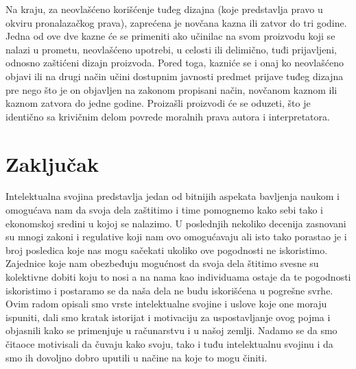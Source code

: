 \documentclass[a4paper]{article}
\begin{document}
Na kraju, za neovlašćeno korišćenje tuđeg dizajna (koje predstavlja pravo u okviru pronalazačkog prava), zaprećena je novčana kazna ili zatvor do tri godine. Jedna od ove dve kazne će se primeniti ako učinilac na svom proizvodu koji se nalazi u prometu, neovlašćeno upotrebi, u celosti ili delimično, tuđi prijavljeni, odnosno zaštićeni dizajn proizvoda. Pored toga, kazniće se i onaj ko neovlašćeno objavi ili na drugi način učini dostupnim javnosti predmet prijave tuđeg dizajna pre nego što je on objavljen na zakonom propisani način, novčanom kaznom ili kaznom zatvora do jedne godine. Proizašli proizvodi će se oduzeti, što je identično sa krivičnim delom povrede moralnih prava autora i interpretatora.


\label{sec:srb}

\section{Zaključak}
\label{sec:zakljucak}

Intelektualna svojina predstavlja jedan od bitnijih aspekata bavljenja naukom i omogućava nam da svoja dela zaštitimo i time pomognemo kako sebi tako i ekonomskoj sredini u kojoj se nalazimo. U poslednjih nekoliko decenija zasnovani su mnogi zakoni i regulative koji nam ovo omogućavaju ali isto tako porastao je i broj posledica koje nas mogu sačekati ukoliko ove pogodnosti ne iskoristimo. Zajednice koje nam obezbeđuju mogućnost da svoja dela štitimo svesne su kolektivne dobiti koju to nosi a na nama kao individuama ostaje da te pogodnosti iskoristimo i postaramo se da naša dela ne budu iskorišćena u pogrešne svrhe. Ovim radom opisali smo vrste intelektualne svojine i uslove koje one moraju ispuniti, dali smo kratak istorijat i motivaciju za uspostavljanje ovog pojma i objasnili kako se primenjuje u računarstvu i u našoj zemlji. Nadamo se da smo čitaoce motivisali da čuvaju kako svoju, tako i tuđu intelektualnu svojinu i da smo ih dovoljno dobro uputili u načine na koje to mogu činiti.

\appendix
 

\end{document}
